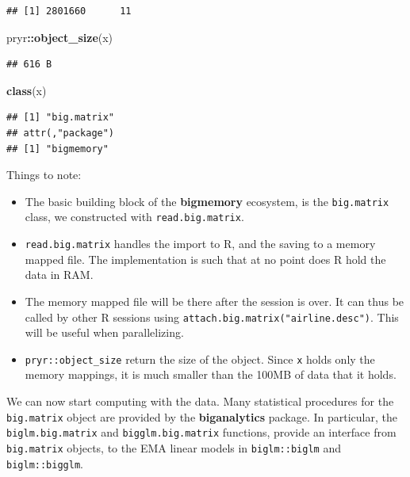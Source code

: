 \documentclass[]{book}
\newenvironment{Shaded}{\begin{snugshade}}{\end{snugshade}}
\newcommand{\KeywordTok}[1]{\textcolor[rgb]{0.13,0.29,0.53}{\textbf{#1}}}
\newcommand{\OperatorTok}[1]{\textcolor[rgb]{0.81,0.36,0.00}{\textbf{#1}}}
\newcommand{\NormalTok}[1]{#1}
\providecommand{\tightlist}{%
  \setlength{\itemsep}{0pt}\setlength{\parskip}{0pt}}
\theoremstyle{definition}
\theoremstyle{definition}
\theoremstyle{definition}
\theoremstyle{remark}
\begin{document}
\begin{verbatim}
## [1] 2801660      11
\end{verbatim}

\begin{Shaded}
\begin{Highlighting}[]
\NormalTok{pryr}\OperatorTok{::}\KeywordTok{object_size}\NormalTok{(x)}
\end{Highlighting}
\end{Shaded}

\begin{verbatim}
## 616 B
\end{verbatim}

\begin{Shaded}
\begin{Highlighting}[]
\KeywordTok{class}\NormalTok{(x)}
\end{Highlighting}
\end{Shaded}

\begin{verbatim}
## [1] "big.matrix"
## attr(,"package")
## [1] "bigmemory"
\end{verbatim}

Things to note:

\begin{itemize}
\tightlist
\item
  The basic building block of the \textbf{bigmemory} ecosystem, is the
  \texttt{big.matrix} class, we constructed with
  \texttt{read.big.matrix}.
\item
  \texttt{read.big.matrix} handles the import to R, and the saving to a
  memory mapped file. The implementation is such that at no point does R
  hold the data in RAM.
\item
  The memory mapped file will be there after the session is over. It can
  thus be called by other R sessions using
  \texttt{attach.big.matrix("airline.desc")}. This will be useful when
  parallelizing.
\item
  \texttt{pryr::object\_size} return the size of the object. Since
  \texttt{x} holds only the memory mappings, it is much smaller than the
  100MB of data that it holds.
\end{itemize}

We can now start computing with the data. Many statistical procedures
for the \texttt{big.matrix} object are provided by the
\textbf{biganalytics} package. In particular, the
\texttt{biglm.big.matrix} and \texttt{bigglm.big.matrix} functions,
provide an interface from \texttt{big.matrix} objects, to the EMA linear
models in \texttt{biglm::biglm} and \texttt{biglm::bigglm}.
\end{document}
